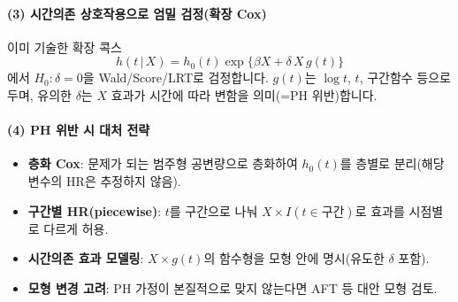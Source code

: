 \documentclass{article}
\begin{document}
\paragraph{(3) 시간의존 상호작용으로 엄밀 검정(확장 Cox)}
이미 기술한 확장 콕스
\[
h(t\,|\,X)=h_0(t)\exp\{\beta X+\delta\,X\,g(t)\}
\]
에서 $H_0:\delta=0$을 Wald/Score/LRT로 검정합니다.
$g(t)$는 $\log t$, $t$, 구간함수 등으로 두며, 유의한 $\delta$는 $X$ 효과가 시간에 따라 변함을 의미(=PH 위반)합니다.

\paragraph{(4) PH 위반 시 대처 전략}
\begin{itemize}
  \item \textbf{층화 Cox}: 문제가 되는 범주형 공변량으로 층화하여 $h_0(t)$를 층별로 분리(해당 변수의 HR은 추정하지 않음).
  \item \textbf{구간별 HR(piecewise)}: $t$를 구간으로 나눠 $X\times I(t\in\text{구간})$로 효과를 시점별로 다르게 허용.
  \item \textbf{시간의존 효과 모델링}: $X\times g(t)$의 함수형을 모형 안에 명시(유도한 $\delta$ 포함).
  \item \textbf{모형 변경 고려}: PH 가정이 본질적으로 맞지 않는다면 AFT 등 대안 모형 검토.
\end{itemize}


\end{document}
